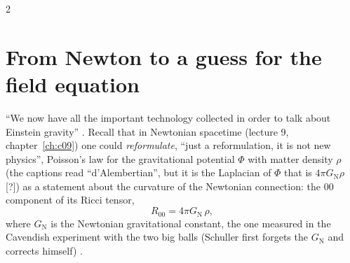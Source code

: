 \begin{paracol}{2}
\section{From Newton to a guess for the field equation}\label{sec:c15-guess}

``We now have all the important technology collected in order to talk about Einstein gravity'' . Recall that in Newtonian spacetime (lecture 9, chapter~\ref{ch:c09}) one could \emph{reformulate}, ``just a reformulation, it is not new physics'', Poisson's law for the gravitational potential $\Phi$ with matter density $\rho$ (the captions read ``d'Alembertian'', but it is the Laplacian of $\Phi$ that is $4\pi G_{\mathrm N}\rho$ [?]) as a statement about the curvature of the Newtonian connection: the $00$ component of its Ricci tensor,
\begin{equation}\label{eq:c15-newton}
  R_{00}=4\pi G_{\mathrm N}\,\rho,
\end{equation}
where $G_{\mathrm N}$ is the Newtonian gravitational constant, the one measured in the Cavendish experiment with the two big balls (Schuller first forgets the $G_{\mathrm N}$ and corrects himself) .


\end{paracol}
